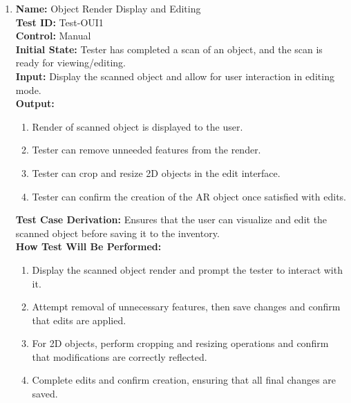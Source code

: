 \documentclass[12pt, titlepage]{article}
\begin{document}
\begin{enumerate}

  \item \textbf{Name:} Object Render Display and Editing \label{itm:Test-OUI1} \\
        \textbf{Test ID:} Test-OUI1 \\
        \textbf{Control:} Manual \\
        \textbf{Initial State:} Tester has completed a scan of an object, and the scan is ready for viewing/editing. \\
        \textbf{Input:} Display the scanned object and allow for user interaction in editing mode. \\
        \textbf{Output:}
        \begin{enumerate}
          \item Render of scanned object is displayed to the user.
          \item Tester can remove unneeded features from the render.
          \item Tester can crop and resize 2D objects in the edit interface.
          \item Tester can confirm the creation of the AR object once satisfied with edits.
        \end{enumerate}
        \textbf{Test Case Derivation:} Ensures that the user can visualize and edit the scanned object before saving it to the inventory. \\
        \textbf{How Test Will Be Performed:}
        \begin{enumerate}
          \item Display the scanned object render and prompt the tester to interact with it.
          \item Attempt removal of unnecessary features, then save changes and confirm that edits are applied.
          \item For 2D objects, perform cropping and resizing operations and confirm that modifications are correctly reflected.
          \item Complete edits and confirm creation, ensuring that all final changes are saved.
        \end{enumerate}


\end{enumerate}
\end{document}
